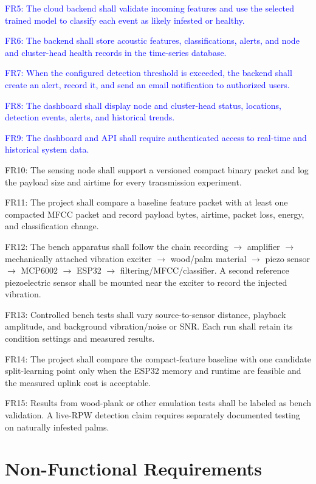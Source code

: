 \documentclass[12pt,a4paper,oneside]{memoir}
\newcommand{\earlierrevision}[1]{\textcolor{blue}{#1}}
\newcommand{\newrevision}[1]{\textcolor{green!45!black}{#1}}
\begin{document}
\earlierrevision{FR5: The cloud backend shall validate incoming features and use the selected trained model to classify each event as likely infested or healthy.}

\earlierrevision{FR6: The backend shall store acoustic features, classifications, alerts, and node and cluster-head health records in the time-series database.}

\earlierrevision{FR7: When the configured detection threshold is exceeded, the backend shall create an alert, record it, and send an email notification to authorized users.}

\earlierrevision{FR8: The dashboard shall display node and cluster-head status, locations, detection events, alerts, and historical trends.}

\earlierrevision{FR9: The dashboard and API shall require authenticated access to real-time and historical system data.}

\newrevision{FR10: The sensing node shall support a versioned compact binary packet and log the payload size and airtime for every transmission experiment.}

\newrevision{FR11: The project shall compare a baseline feature packet with at least one compacted MFCC packet and record payload bytes, airtime, packet loss, energy, and classification change.}

\newrevision{FR12: The bench apparatus shall follow the chain recording $\rightarrow$ amplifier $\rightarrow$ mechanically attached vibration exciter $\rightarrow$ wood/palm material $\rightarrow$ piezo sensor $\rightarrow$ MCP6002 $\rightarrow$ ESP32 $\rightarrow$ filtering/MFCC/classifier. A second reference piezoelectric sensor shall be mounted near the exciter to record the injected vibration.}

\newrevision{FR13: Controlled bench tests shall vary source-to-sensor distance, playback amplitude, and background vibration/noise or SNR. Each run shall retain its condition settings and measured results.}

\newrevision{FR14: The project shall compare the compact-feature baseline with one candidate split-learning point only when the ESP32 memory and runtime are feasible and the measured uplink cost is acceptable.}

\newrevision{FR15: Results from wood-plank or other emulation tests shall be labeled as bench validation. A live-RPW detection claim requires separately documented testing on naturally infested palms.}

\section{Non-Functional Requirements}
\label{sec:NFR}
 
\end{document}
